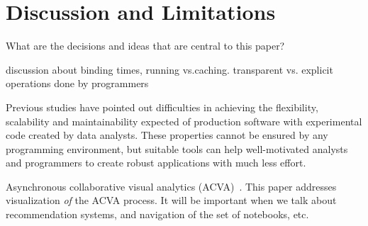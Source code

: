 \documentclass[review,journal]{vgtc}         %
\begin{document}
\section{Discussion and Limitations}

What are the decisions and ideas that are central to this paper?

discussion about binding times, running vs.caching.
transparent vs. explicit operations done by programmers

Previous studies have pointed out difficulties in achieving the flexibility,
scalability and maintainability expected of production software with experimental
code created by data analysts.
These properties cannot be ensured by any programming environment,
but suitable tools can help well-motivated analysts and programmers to create
robust applications with much less effort.

Asynchronous collaborative visual analytics
(ACVA)~\cite{Chen:2011:SEC}. This paper addresses visualization
\emph{of} the ACVA process. It will be important when we talk about
recommendation systems, and navigation of the set of notebooks, etc.




\end{document}
